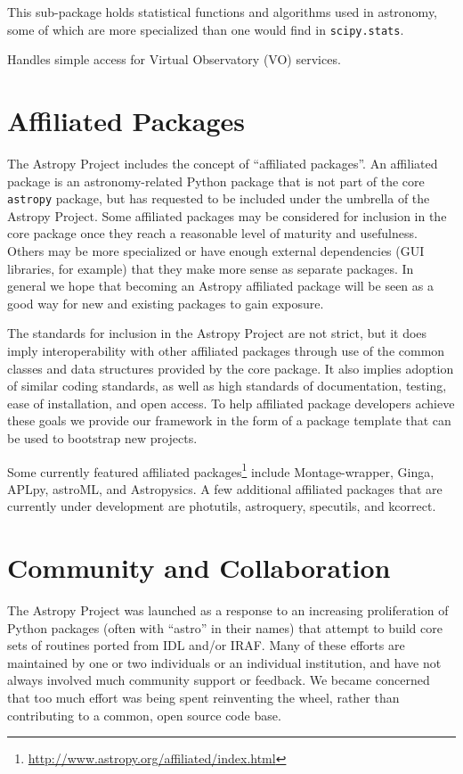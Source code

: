 \documentclass[11pt,twoside]{article}
\begin{document}
This sub-package holds statistical functions and algorithms used in astronomy,
some of which are more specialized than one would find in
\texttt{scipy.stats}.


Handles simple access for Virtual Observatory (VO) services.

\section{Affiliated Packages}

The Astropy Project includes the concept of ``affiliated packages''.  An
affiliated package is an astronomy-related Python package that is not part of
the core \texttt{astropy} package, but has requested to be included under the
umbrella of the Astropy Project.  Some affiliated packages may be considered
for inclusion in the core package once they reach a reasonable level of
maturity and usefulness.  Others may be more specialized or have enough
external dependencies (GUI libraries, for example) that they make more sense as
separate packages.  In general we hope that becoming an Astropy affiliated
package will be seen as a good way for new and existing packages to gain
exposure.

The standards for inclusion in the Astropy Project are not strict, but it does
imply interoperability with other affiliated packages through use of the common
classes and data structures provided by the core package.  It also implies
adoption of similar coding standards, as well as high standards of
documentation, testing, ease of installation, and open access.  To help
affiliated package developers achieve these goals we provide our framework in
the form of a package template that can be used to bootstrap new projects.

Some currently featured affiliated
packages\footnote{\url{http://www.astropy.org/affiliated/index.html}} include
Montage-wrapper, Ginga, APLpy, astroML, and Astropysics.  A few additional
affiliated packages that are currently under development are photutils,
astroquery, specutils, and kcorrect.

\section{Community and Collaboration}

The Astropy Project was launched as a response to an increasing proliferation
of Python packages (often with ``astro'' in their names) that attempt to build
core sets of routines ported from IDL and/or IRAF.  Many of these efforts are
maintained by one or two individuals or an individual institution, and have not
always involved much community support or feedback.  We became concerned that
too much effort was being spent reinventing the wheel, rather than contributing
to a common, open source code base.
\end{document}
